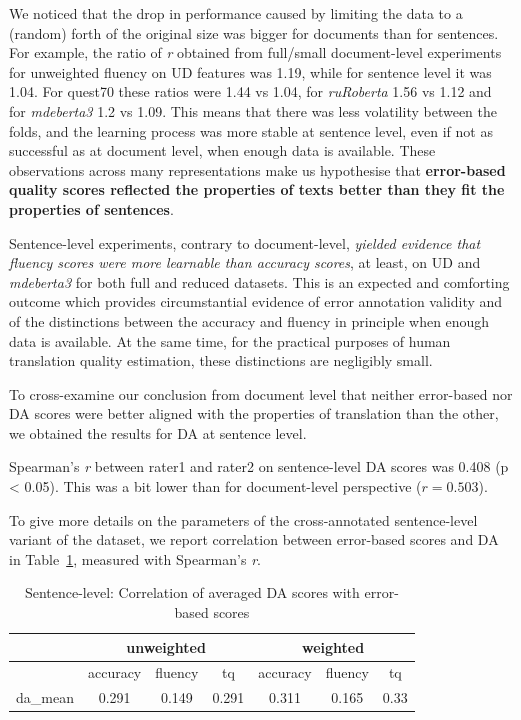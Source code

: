 We noticed that the drop in performance caused by limiting the data to a (random) forth of the original size was bigger for documents than for sentences. For example, the ratio of \textit{r} obtained from full/small document-level experiments for unweighted fluency on UD features was 1.19, while for sentence level it was 1.04. For quest70 these ratios were 1.44 vs 1.04, for \textit{ruRoberta} 1.56 vs 1.12 and for \textit{mdeberta3} 1.2 vs 1.09.
This means that there was less volatility between the folds, and the learning process was more stable at sentence level, even if not as successful as at document level, when enough data is available. 
These observations across many representations make us hypothesise that \textbf{error-based quality scores reflected the properties of texts better than they fit the properties of sentences}. 

Sentence-level experiments, contrary to document-level, \textit{yielded evidence that fluency scores were more learnable than accuracy scores}, at least, on UD and \textit{mdeberta3} for both full and reduced datasets. 
This is an expected and comforting outcome which provides circumstantial evidence of error annotation validity and of the distinctions between the accuracy and fluency in principle when enough data is available. At the same time, for the practical purposes of human translation quality estimation, these distinctions are negligibly small. 

To cross-examine our conclusion from document level that neither error-based nor DA scores were better aligned with the properties of translation than the other, we obtained the results for DA at sentence level. 

Spearman's \textit{r} between rater1 and rater2 on sentence-level DA scores was 0.408 (p < 0.05). This was a bit lower than for document-level perspective ($r=0.503$).

To give more details on the parameters of the cross-annotated sentence-level variant of the dataset, we report correlation between error-based scores and DA in Table~\ref{tab:sent_err-da_corr}, measured with Spearman's \textit{r}.

\begin{table}[H]
	\centering
	\begin{tabular}{l|ccc|ccc}
		\toprule
		& \multicolumn{3}{c|}{unweighted} & \multicolumn{3}{c}{weighted} \\
		\midrule
		& accuracy   & fluency & tq    & accuracy & fluency & tq    \\
		\midrule
		da\_mean & 0.291 & 0.149 & 0.291 & 0.311 & 0.165 & 0.33 \\
		\bottomrule
	\end{tabular}
	\caption{\label{tab:sent_err-da_corr}Sentence-level: Correlation of averaged DA scores with error-based scores}
\end{table}

